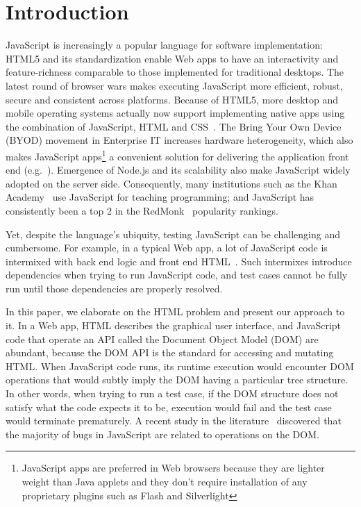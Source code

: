 \section{Introduction}

JavaScript is increasingly a popular language for software implementation: %
HTML5 and its standardization enable Web apps to have an interactivity and feature-richness comparable to those implemented for traditional desktops.  The latest round of browser wars makes executing JavaScript more efficient, robust, secure and consistent across platforms.  Because of HTML5, more desktop and mobile operating systems actually now support implementing native apps using the combination of JavaScript, HTML and CSS~\cite{jalangi}.
The Bring Your Own Device (BYOD) movement in Enterprise IT increases hardware heterogeneity, which also makes JavaScript apps\footnote{JavaScript apps are preferred in Web browsers because they are lighter weight than Java applets and they don't require installation of any proprietary plugins such as Flash and Silverlight} a convenient solution for delivering the application front end (e.g.~\cite{BNSFoffice365}).
Emergence of Node.js and its scalability also make JavaScript widely adopted on the server side.
Consequently, many institutions such as the Khan Academy~\cite{khanAcademy} use JavaScript for teaching programming; and JavaScript has consistently been a top 2 in the RedMonk~\cite{redmonk} popularity rankings.%

Yet, despite the language's ubiquity, testing JavaScript can be challenging and cumbersome.
For example, in a typical Web app, a lot of JavaScript code is intermixed with back end logic and front end HTML~\cite{QUnitIntro}.
Such intermixes introduce dependencies when trying to run JavaScript code, and test cases cannot be fully run until those dependencies are properly resolved.

In this paper, we elaborate on the HTML problem and present our approach to it.
In a Web app, HTML describes the graphical user interface, and JavaScript code that operate an API called the Document Object Model (DOM) are abundant, because the DOM API is the standard for accessing and mutating HTML.
When JavaScript code runs, its runtime execution would encounter DOM operations that would subtly imply the DOM having a particular tree structure. 
In other words, when trying to run a test case, if the DOM structure does not satisfy what the code expects it to be, execution would fail and the test case would terminate prematurely.
A recent study in the literature~\cite{frolin2013} discovered that the majority of bugs in JavaScript are related to operations on the DOM.

